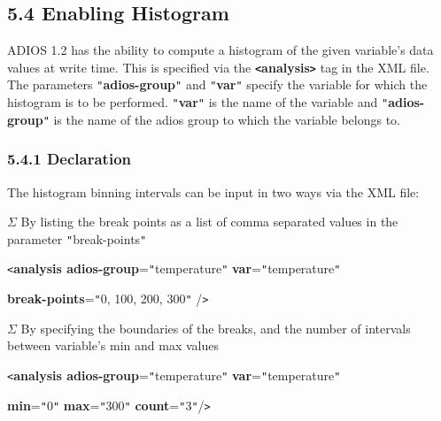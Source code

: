 \subsection*{{\large 5.4 }{\large \textbf{Enabling Histogram}}}

\vspace{10pt}
\leftskip=0pt
\parindent=0pt
ADIOS 1.2 has the ability to {\color{color01} compute a histogram of the given 
variable's data values at write time}. This is specified via the \textbf{\texttt{<}analysis\texttt{>}} 
tag in the XML file. The parameters \texttt{"}\textbf{adios-group}\texttt{"} and 
\texttt{"}\textbf{var}\texttt{"} specify the variable for which the histogram is 
to be performed. \texttt{"}\textbf{var}\texttt{"} is the name of the variable and 
\texttt{"}\textbf{adios-group}\texttt{"} is the name of the adios group to which 
the variable belongs to. \label{HToc182553377}

\vspace{10pt}
\subsubsection*{{\large \textbf{5.4.1 Declaration}}}

\vspace{10pt}
The histogram binning intervals can be input in two ways via the XML file:

\vspace{10pt}
\ensuremath{\Sigma} By listing the break points as a list of comma separated values 
in the parameter \texttt{"}break-points\texttt{"} 

\vspace{10pt}
\leftskip=99pt
\parindent=-59pt
\texttt{<}\textbf{analysis adios-group}=\texttt{"}temperature\texttt{"}    \textbf{var}=\texttt{"}temperature\texttt{"}

\vspace{10pt}
\parindent=-63pt
\textbf{break-points}=\texttt{"}0, 100, 200, 300\texttt{"} /\texttt{>}

\vspace{10pt}
\leftskip=0pt
\parindent=0pt
\ensuremath{\Sigma} By specifying the boundaries of the breaks, and the number 
of intervals between variable's min and max values

\vspace{10pt}
\leftskip=99pt
\parindent=-63pt
\texttt{<}\textbf{analysis adios-group}=\texttt{"}temperature\texttt{"}    \textbf{var}=\texttt{"}temperature\texttt{"}

\vspace{10pt}
\textbf{min}=\texttt{"}0\texttt{"}    \textbf{max}=\texttt{"}300\texttt{"}    \textbf{count}=\texttt{"}3\texttt{"}/\texttt{>}

